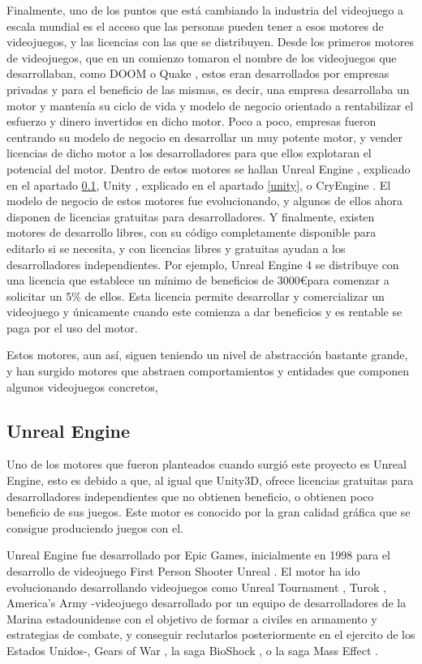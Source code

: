 Finalmente, uno de los puntos que está cambiando la industria del videojuego a escala mundial es el acceso que las personas pueden tener a esos motores de videojuegos, y las licencias con las que se distribuyen. Desde los primeros motores de videojuegos, que en un comienzo tomaron el nombre de los videojuegos que desarrollaban, como DOOM \cite{doom} o Quake \cite{quake}, estos eran desarrollados por empresas privadas y para el beneficio de las mismas, es decir, una empresa desarrollaba un motor y mantenía su ciclo de vida y modelo de negocio orientado a rentabilizar el esfuerzo y dinero invertidos en dicho motor. Poco a poco, empresas fueron centrando su modelo de negocio en desarrollar un muy potente motor, y vender licencias de dicho motor a los desarrolladores para que ellos explotaran el potencial del motor. Dentro de estos motores se hallan Unreal Engine \cite{unrealengine}, explicado en el apartado \ref{unreal}, Unity \cite{unity}, explicado en el apartado \ref{unity}, o CryEngine \cite{cryengine}. El modelo de negocio de estos motores fue evolucionando, y algunos de ellos ahora disponen de licencias gratuitas para desarrolladores. Y finalmente, existen motores de desarrollo libres, con su código completamente disponible para editarlo si se necesita, y con licencias libres y gratuitas ayudan a los desarrolladores independientes. Por ejemplo, Unreal Engine 4 se distribuye con una licencia que establece un mínimo de beneficios de 3000\euro para comenzar a solicitar un 5\% de ellos. Esta licencia permite desarrollar y comercializar un videojuego y únicamente cuando este comienza a dar beneficios y es rentable se paga por el uso del motor. 

Estos motores, aun así, siguen teniendo un nivel de abstracción bastante grande, y han surgido motores que abstraen comportamientos y entidades que componen algunos videojuegos concretos, 

\subsection{Unreal Engine}
\label{unreal}

Uno de los motores que fueron planteados cuando surgió este proyecto es Unreal Engine, esto es debido a que, al igual que Unity3D, ofrece licencias gratuitas para desarrolladores independientes que no obtienen beneficio, o obtienen poco beneficio de sus juegos. Este motor es conocido por la gran calidad gráfica que se consigue produciendo juegos con el.

Unreal Engine fue desarrollado por Epic Games, inicialmente en 1998 para el desarrollo de videojuego First Person Shooter Unreal \cite{unrealengine}. El motor ha ido evolucionando desarrollando videojuegos como Unreal Tournament \cite{unrealgame}, Turok \cite{turok}, America's Army \cite{Pearcy2012} -videojuego desarrollado por un equipo de desarrolladores de la Marina estadounidense con el objetivo de formar a civiles en armamento y estrategias de combate, y conseguir reclutarlos posteriormente en el ejercito de los Estados Unidos-, Gears of War \cite{gearsofwar}, la saga BioShock \cite{bioshock}, o la saga Mass Effect \cite{masseffect}. 

